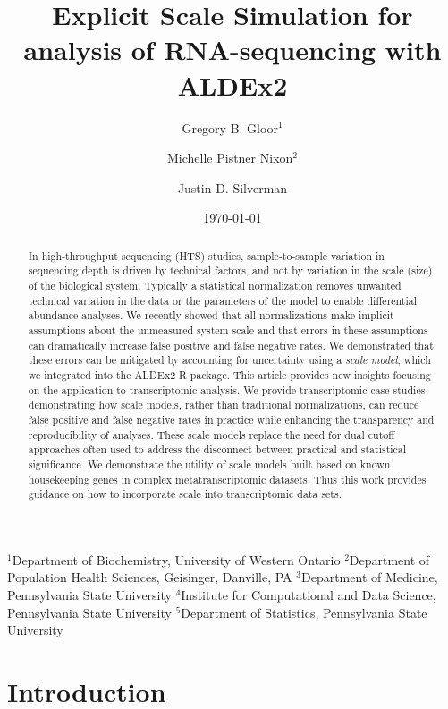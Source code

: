\documentclass[
]{article}
\title{Explicit Scale Simulation for analysis of RNA-sequencing \DIFaddbegin \DIFadd{count
data }\DIFaddend with ALDEx2}
\author{Gregory B. Gloor$^1$ \and Michelle Pistner Nixon$^2$ \and Justin D. Silverman\DIFdelbegin \DIFdel{$^{2,3,4,5}$}\DIFdelend \DIFaddbegin \DIFadd{$^{3,4,5}$}\DIFaddend }
\date{\today}
\providecommand{\DIFadd}[1]{{\protect\color{blue}\uwave{#1}}} %
\providecommand{\DIFaddbegin}{} %
\providecommand{\DIFaddend}{} %
\newcommand{\DIFaddincludegraphics}[2][]{{\color{blue}\fbox{\DIFOincludegraphics[#1]{#2}}}} %
\DeclareRobustCommand{\DIFaddbegin}{\DIFOaddbegin \let\includegraphics\DIFaddincludegraphics} %
\DeclareRobustCommand{\DIFaddend}{\DIFOaddend \let\includegraphics\DIFOincludegraphics} %
\begin{document}
\maketitle

$^1$Department of Biochemistry, University of Western Ontario
$^2$Department of Population Health Sciences, Geisinger, Danville, PA
$^3$Department of Medicine, Pennsylvania State University
$^4$Institute for Computational and Data Science, Pennsylvania State University
$^5$Department of Statistics, Pennsylvania State University

\DIFaddbegin \DIFadd{$^1$corresponding author: ggloor@uwo.ca
}\DIFaddend \begin{abstract}
In high-throughput sequencing (HTS) studies, sample-to-sample variation
in sequencing depth is driven by technical factors, and not by variation
in the scale (size) of the biological system. Typically a statistical
normalization removes unwanted technical variation in the data or the
parameters of the model to enable differential abundance analyses. We
recently showed that all normalizations make implicit assumptions about
the unmeasured system scale and that errors in these assumptions can
dramatically increase false positive and false negative rates. We
demonstrated that these errors can be mitigated by accounting for
uncertainty using a \emph{scale model}, which we integrated into the
ALDEx2 R package. This article provides new insights focusing on the
application to transcriptomic analysis. We provide transcriptomic case
studies demonstrating how scale models, rather than traditional
normalizations, can reduce false positive and false negative rates in
practice while enhancing the transparency and reproducibility of
analyses. These scale models replace the need for dual cutoff approaches
often used to address the disconnect between practical and statistical
significance. We demonstrate the utility of scale models built based on
known housekeeping genes in complex metatranscriptomic datasets. Thus
this work provides guidance on how to incorporate scale into
transcriptomic data sets.
\end{abstract}

\section{Introduction}\label{introduction}

\doublespacing \singlespacing 
\DIFaddbegin \linenumbers
\DIFaddend 
\end{document}
